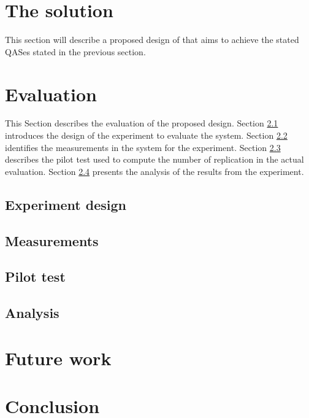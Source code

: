 \documentclass[conference]{IEEEtran}
\begin{document}
\section{The solution}
\label{sec:middleware_architecture}


This section will describe a proposed design of that aims to achieve the stated QASes stated in the previous section.






\section{Evaluation}
\label{sec:evaluation}
This Section describes the evaluation of the proposed design.
Section \ref{sec:design} introduces the design of the experiment to evaluate the system.
Section \ref{sec:measurements} identifies the measurements in the system for the experiment.
Section \ref{sec:pilot_test} describes the pilot test used to compute the number of replication in the actual evaluation.
Section \ref{sec:analysis} presents the analysis of the results from the experiment.


\subsection{Experiment design}
\label{sec:design}


\subsection{Measurements}
\label{sec:measurements}


\subsection{Pilot test}
\label{sec:pilot_test}

\subsection{Analysis}
\label{sec:analysis}


\section{Future work}


\section{Conclusion}




\vspace{12pt}
\end{document}
